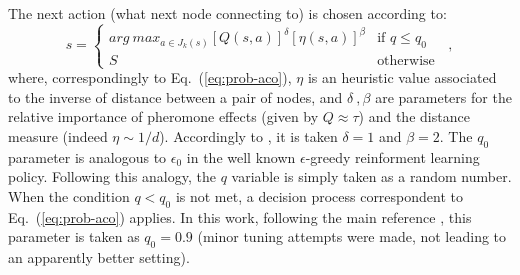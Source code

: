 \documentclass[10pt]{article}
\begin{document}
The next action (what next node connecting to) is chosen according to:
\begin{equation}
s = \begin{cases} arg~max_{a \in J_k(s)} [Q(s,a)]^\delta [\eta(s,a)]^\beta & \mbox{if } q \leq q_0 \\ S & \mbox{otherwise } \end{cases} ~,
\label{eq:antq-choice}
\end{equation}
where, correspondingly to Eq.~(\ref{eq:prob-aco}), $\eta$ is an heuristic value associated to the inverse of distance between a pair of nodes, and $\delta~, \beta$ are parameters for the relative importance of pheromone effects (given by $Q \approx \tau$) and the distance measure (indeed $\eta \sim 1/d$). Accordingly to \cite{undici}, it is taken $\delta=1$ and $\beta=2$.
The $q_0$ parameter is analogous to $\epsilon_0$  in the well known $\epsilon$-greedy reinforment learning policy. Following this analogy, the $q$ variable is simply taken as a random number. When the condition $q<q_0$ is not met, a decision process correspondent to Eq.~(\ref{eq:prob-aco}) applies. In this work, following the main reference \cite{undici}, this parameter is taken as $q_0=0.9$ (minor tuning attempts were made, not leading to an apparently better setting).
\end{document}
